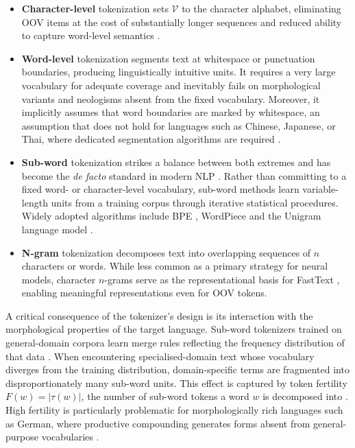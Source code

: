 \begin{itemize}
    \item \textbf{Character-level} tokenization sets $\mathcal{V}$ to the character alphabet, eliminating \linebreak \ac{OOV} items at the cost of substantially longer sequences and reduced ability to capture word-level semantics  \cite{Rust2021_Tokenizer}.
    
    \item \textbf{Word-level} tokenization segments text at whitespace or punctuation boundaries, producing linguistically intuitive units. It requires a very large vocabulary for adequate coverage and inevitably fails on morphological variants and neologisms absent from the fixed vocabulary. Moreover, it implicitly assumes that word boundaries are marked by whitespace, an assumption that does not hold for languages such as Chinese, Japanese, or Thai, where dedicated segmentation algorithms are required \cite[p. 6 f.]{Jurafsky2024_SLP}\cite{sennrich_neural_2016}.

    \item \textbf{Sub-word} tokenization strikes a balance between both extremes and has become the \textit{de facto} standard in modern \ac{NLP} \cite{Rust2021_Tokenizer}. Rather than committing to a fixed word- or character-level vocabulary, sub-word methods learn variable-length units from a training corpus through iterative statistical procedures. Widely adopted algorithms include BPE \cite{sennrich_neural_2016}, WordPiece \cite{devlin_2019_bert} and the Unigram language model \cite{Kudo_SentencePiece_2018}.
    
    \item \textbf{N-gram} tokenization decomposes text into overlapping sequences of $n$ characters or words. While less common as a primary strategy for neural models, character $n$-grams serve as the representational basis for FastText \cite{Bojanowski_FastText_2017}, enabling meaningful representations even for \ac{OOV} tokens.
\end{itemize}

\noindent A critical consequence of the tokenizer's design is its interaction with the morphological properties of the target language. Sub-word tokenizers trained on general-domain corpora learn merge rules reflecting the frequency distribution of that data \cite{sennrich_neural_2016, Bostrom2020_BPE}. When encountering specialised-domain text whose vocabulary diverges from the training distribution, domain-specific terms are fragmented into disproportionately many sub-word units. This effect is captured by token fertility $F(w) = |\tau(w)|$, the number of sub-word tokens a word $w$ is decomposed into \cite{Rust2021_Tokenizer}. High fertility is particularly problematic for morphologically rich languages such as German, where productive compounding generates forms absent from general-purpose vocabularies \cite{Bostrom2020_BPE}.

